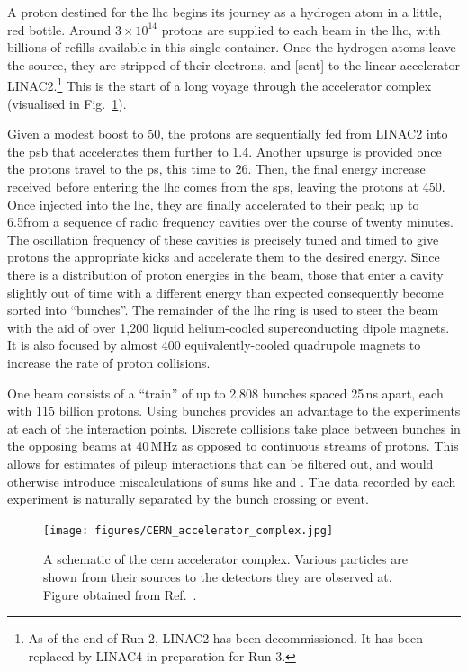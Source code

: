 A proton destined for the \acrshort{lhc} begins its journey as a hydrogen atom in a little, red bottle. Around $\text{3} \times \text{10}^{\text{14}}$ protons are supplied to each beam in the \acrshort{lhc}, with billions of refills available in this single container. Once the hydrogen atoms leave the source, they are stripped of their electrons, and [sent] to the linear accelerator LINAC2.\footnote{As of the end of Run-2, LINAC2 has been decommissioned. It has been replaced by LINAC4 in preparation for Run-3.} This is the start of a long voyage through the accelerator complex (visualised in Fig.~\ref{fig:cern_accelerator_complex}).

Given a modest boost to 50\MeV, the protons are sequentially fed from LINAC2 into the \acrfull{psb} that accelerates them further to 1.4\GeV. Another upsurge is provided once the protons travel to the \acrfull{ps}, this time to 26\GeV. Then, the final energy increase received before entering the \acrshort{lhc} comes from the \acrfull{sps}, leaving the protons at 450\GeV. Once injected into the \acrshort{lhc}, they are finally accelerated to their peak; up to 6.5\TeV from a sequence of radio frequency cavities over the course of twenty minutes. The oscillation frequency of these cavities is precisely tuned and timed to give protons the appropriate kicks and accelerate them to the desired energy. Since there is a distribution of proton energies in the beam, those that enter a cavity slightly out of time with a different energy than expected consequently become sorted into ``bunches''. The remainder of the \acrshort{lhc} ring is used to steer the beam with the aid of over 1,200 liquid helium-cooled superconducting dipole magnets. It is also focused by almost 400 equivalently-cooled quadrupole magnets to increase the rate of proton collisions.

One beam consists of a ``train'' of up to 2,808 bunches spaced 25\,ns apart, each with 115 billion protons. Using bunches provides an advantage to the experiments at each of the interaction points. Discrete collisions take place between bunches in the opposing beams at 40\,MHz as opposed to continuous streams of protons. This allows for estimates of \gls{pileup} interactions that can be filtered out, and would otherwise introduce miscalculations of sums like \ptmiss and \HT. The data recorded by each experiment is naturally separated by the bunch crossing or event.

\begin{figure}[htbp]
    \centering
    \texttt{[image: figures/CERN\_accelerator\_complex.jpg]}
    \caption[A schematic of the \acrshort{cern} accelerator complex]{A schematic of the \acrshort{cern} accelerator complex. Various particles are shown from their sources to the detectors they are observed at. Figure obtained from Ref.~.}
    \label{fig:cern_accelerator_complex}
\end{figure}

